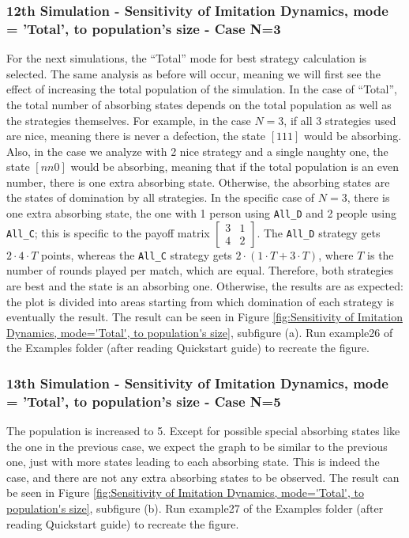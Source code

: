 \subsubsection{12th Simulation - Sensitivity of Imitation Dynamics, mode = 'Total', to population's size - Case N=3}
For the next simulations, the ``Total'' mode for best strategy calculation is selected. The same analysis as before will occur, meaning we will first see the effect of increasing the total population of the simulation. In the case of ``Total'', the total number of absorbing states depends on the total population as well as the strategies themselves. For example, in the case $N=3$, if all 3 strategies used are nice, meaning there is never a defection, the state $[1 1 1]$ would be absorbing. Also, in the case we analyze with 2 nice strategy and a single naughty one, the state $[n n 0]$ would be absorbing, meaning that if the total population is an even number, there is one extra absorbing state. Otherwise, the absorbing states are the states of domination by all strategies. In the specific case of $N=3$, there is one extra absorbing state, the one with 1 person using \texttt{All\_D} and 2 people using \texttt{All\_C}; this is specific to the payoff matrix $\begin{bmatrix} 3 & 1 \\ 4 & 2 \end{bmatrix}$. The \texttt{All\_D} strategy gets $2 \cdot 4 \cdot T$ points, whereas the \texttt{All\_C} strategy gets $2 \cdot (1 \cdot T + 3 \cdot T)$, where $T$ is the number of rounds played per match, which are equal. Therefore, both strategies are best and the state is an absorbing one. Otherwise, the results are as expected: the plot is divided into areas starting from which domination of each strategy is eventually the result. The result can be seen in Figure \ref{fig:Sensitivity of Imitation Dynamics, mode='Total', to population's size}, subfigure (a). Run example26 of the Examples folder (after reading Quickstart guide) to recreate the figure.

\subsubsection{13th Simulation - Sensitivity of Imitation Dynamics, mode = 'Total', to population's size - Case N=5}
The population is increased to 5. Except for possible special absorbing states like the one in the previous case, we expect the graph to be similar to the previous one, just with more states leading to each absorbing state. This is indeed the case, and there are not any extra absorbing states to be observed. The result can be seen in Figure \ref{fig:Sensitivity of Imitation Dynamics, mode='Total', to population's size}, subfigure (b). Run example27 of the Examples folder (after reading Quickstart guide) to recreate the figure.

